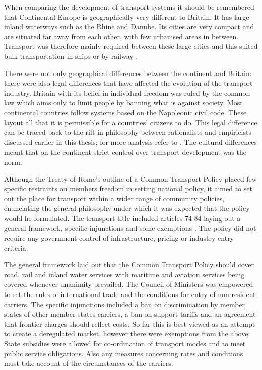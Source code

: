 When comparing the development of transport systems it should be remembered that Continental Europe is geographically very different to Britain. It has large inland waterways such as the Rhine and Danube. Its cities are very compact and are situated far away from each other, with few urbanised areas in between. Transport was therefore mainly required between these large cities and this suited bulk transportation in ships or by railway \citep{Gwilliam:1975}.

There were not only geographical differences between the continent and Britain: there were also legal differences that have affected the evolution of the transport industry. Britain with its belief in individual freedom was ruled by the common law which aims only to limit people by banning what is against society. Most continental countries follow systems based on the Napoleonic civil code. These layout all that it is permissible for a countries' citizens to do. This legal difference can be traced back to the rift in philosophy between rationalists and empiricists discussed earlier in this thesis; for more analysis refer to \citep{Hibbs:1993b}. The cultural differences meant that on the continent strict control over transport development was the norm.

Although the Treaty of Rome's outline of a Common Transport Policy placed few specific restraints on members freedom in setting national policy, it aimed to set out the place for transport within a wider range of community policies, enunciating the general philosophy under which it was expected that the policy would he formulated. The transport title included articles 74-84 laying out a general framework, specific injunctions and some exemptions \citep{Gwilliam:1975}. The policy did not require any government control of infrastructure, pricing or industry entry criteria.

The general framework laid out that the Common Transport Policy should cover road, rail and inland water services with maritime and aviation services being covered whenever unanimity prevailed. The Council of Ministers was empowered to set the rules of international trade and the conditions for entry of non-resident carriers. The specific injunctions included a ban on discrimination by member states of other member states carriers, a ban on support tariffs and an agreement that frontier charges should reflect costs. So far this is best viewed as an attempt to create a deregulated market, however there were exemptions from the above: State subsidies were allowed for co-ordination of transport modes and to meet public service obligations. Also any measures concerning rates and conditions must take account of the circumstances of the carriers.

